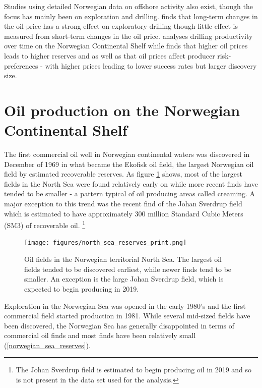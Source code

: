 \documentclass[11pt]{article}
\begin{document}
Studies using detailed Norwegian data on offshore activity also exist, though the focus has mainly been on exploration and drilling.  \citet{mohn_exploration_2008} finds that long-term changes in the oil-price has a strong effect on exploratory drilling though little effect is measured from short-term changes in the oil price.  \citet{osmundsen_exploration_2010} analyses drilling productivity over time on the Norwegian Continental Shelf while \citet{mohn_efforts_2008} finds that higher oil prices leads to higher reserves and as well as that oil prices affect producer risk-preferences - with higher prices leading to lower success rates but larger discovery size.  


\section{Oil production on the Norwegian Continental Shelf}


The first commercial oil well in Norwegian continental waters was discovered in December of 1969 in what became the Ekofisk oil field, the largest Norwegian oil field by estimated recoverable reserves.  As figure \ref{north_sea_reserves} shows, most of the largest fields in the North Sea were found relatively early on while more recent finds have tended to be smaller - a pattern typical of oil producing areas called creaming.  A major exception to this trend was the recent find of the Johan Sverdrup field which is estimated to have approximately 300 million Standard Cubic Meters (SM3) of recoverable oil. \footnote{The Johan Sverdrup field is estimated to begin producing oil in 2019 and so is not present in the data set used for the analysis.}  

\begin{figure}
\texttt{[image: figures/north\_sea\_reserves\_print.png]}
\caption{Oil fields in the Norwegian territorial North Sea.  The largest oil fields tended to be discovered earliest, while newer finds tend to be smaller.  An exception is the large Johan Sverdrup field, which is expected to begin producing in 2019.}
\label{north_sea_reserves}
\end{figure}

Exploration in the Norwegian Sea was opened in the early 1980’s and the first commercial field started production in 1981.  While several mid-sized fields have been discovered, the Norwegian Sea has generally disappointed in terms of commercial oil finds and most finds have been relatively small (\ref{norwegian_sea_reserves}).  
\end{document}
